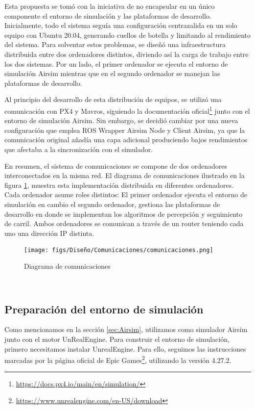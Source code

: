 Esta propuesta se tomó con la iniciativa de no encapsular en un único componente el entorno de simulación y las plataformas de desarrollo. Inicialmente, todo el sistema 
seguía una configuración centrazalida en un solo equipo con Ubuntu 20.04, generando cuellos de botella y limitando al rendimiento del sistema. Para solventar estos problemas, 
se diseñó una infraestructura distribuida entre dos ordenadores distintos, diviendo así la carga de trabajo entre los dos sistemas. Por un lado, el primer ordenador se
ejecuta el entorno de simulación Airsim mientras que en el segundo ordenador se manejan las plataformas de desarrollo. \newline

Al principio del desarrollo de esta distribución de equipos, se utilizó una comunicación con PX4 y Mavros, siguiendo la documentación oficial\footnote{\url{https://docs.px4.io/main/en/simulation/}} 
junto con el entorno de simulación Airsim. Sin embargo, se decidió cambiar por una nueva configuración que emplea ROS Wrapper Airsim Node y Client Airsim, ya que 
la comunicación original añadía una capa adicional produciendo bajos rendimientos que afectaba a la sincronización con el simulador. 

En resumen, el sistema de comunicaciones se compone de dos ordenadores interconectados en la misma red. El diagrama 
de comunicaciones ilustrado en la figura \ref{fig:diagramadeAirsim}, muestra esta implementación distribuida en diferentes ordenadores. Cada ordenador asume roles distintos: 
El primer ordenador ejecuta el entorno de simulación en cambio el segundo ordenador, gestiona las plataformas de desarrollo en donde se implementan los algoritmos 
de percepción y seguimiento de carril. Ambos ordenadores se comunican a través de un router teniendo cada uno una dirección IP distinta. 

\begin{figure} [H]
  \begin{center}
    \texttt{[image: figs/Diseño/Comunicaciones/comunicaciones.png]}
  \end{center}
  \caption{Diagrama de comunicaciones}
  \label{fig:diagramadeAirsim}
\end{figure}\

\subsection{Preparación del entorno de simulación}
\label{sec:Preparación_entorno}

Como mencionamos en la sección \ref{sec:Airsim}, utilizamos como simulador Airsim junto con el motor UnRealEngine. Para construir el entorno de simulación, primero
necesitamos instalar UnrealEngine. Para ello, seguimos las instrucciones marcadas por la página oficial de Epic Games\footnote{\url{https://www.unrealengine.com/en-US/download}}, 
utilizando la versión 4.27.2.

